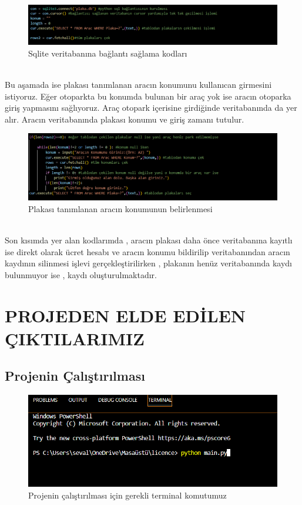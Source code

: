  \begin{figure}
    \centering
    \includegraphics{sql bağlantısı ile python kodları.PNG}
    \caption{Sqlite veritabanına bağlantı sağlama kodları}
    \label{fig:my_label}
\end{figure} \\
\cite{pythonforsqlite}
Bu aşamada ise plakası tanımlanan aracın konumunu kullanıcan girmesini istiyoruz. Eğer otoparkta bu konumda bulunan bir araç yok ise aracın otoparka giriş yapmasını sağlıyoruz. Araç otopark içerisine girdiğinde veritabanında da yer alır. Aracın veritabanında plakası konumu ve giriş zamanı tutulur.

 \begin{figure}
    \centering
    \includegraphics{plakanın konumunun kullanıcıdan alınması.PNG}
    \caption{Plakası tanımlanan aracın konumunun belirlenmesi}
    \label{fig:my_label}
\end{figure} \\
Son kısımda yer alan kodlarımda , aracın plakası daha önce veritabanına kayıtlı ise direkt olarak ücret hesabı ve aracın konumu bildirilip veritabanından aracın kaydının silinmesi işlevi gerçekleştirilirken , plakanın henüz veritabanında kaydı bulunmuyor ise , kaydı oluşturulmaktadır.

\section{PROJEDEN ELDE EDİLEN ÇIKTILARIMIZ}
\subsection{Projenin Çalıştırılması}
 \begin{figure}
    \centering
    \includegraphics{çalıştırma komutu.PNG}
    \caption{Projenin çalıştırılması için gerekli terminal komutumuz}
    \label{fig:my_label}
\end{figure} \\

